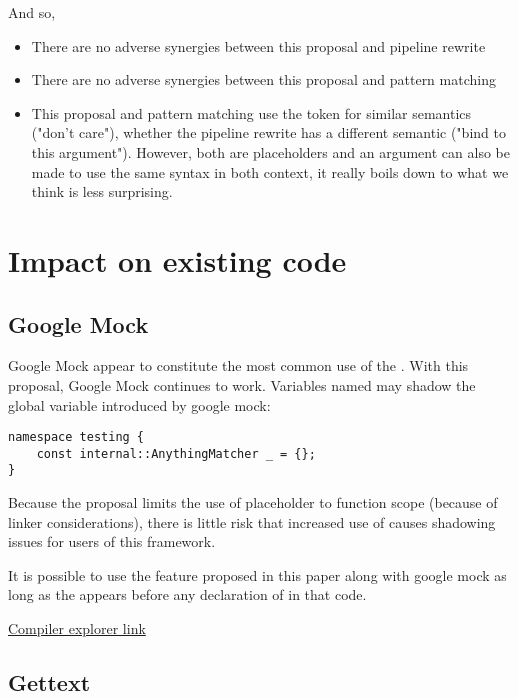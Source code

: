 \documentclass{wg21}
\begin{document}
{And so,

\begin{itemize}
\item There are no adverse synergies between this proposal and pipeline rewrite
\item There are no adverse synergies between this proposal and pattern matching
\item This proposal and pattern matching use the \tcode{_} token for similar semantics ("don't care"), whether the pipeline rewrite has a different semantic ("bind to this argument").
However, both are placeholders and an argument can also be made to use the same syntax in both context, it really boils down to what we think is less surprising.
\end{itemize}


\section{Impact on existing code}

\subsection{Google Mock}

Google Mock appear to constitute the most common use of the .
With this proposal, Google Mock continues to work.
Variables named \tcode{_} may shadow the  global variable introduced by google mock:

\begin{lstlisting}[style=color]
namespace testing {
    const internal::AnythingMatcher _ = {};
}
\end{lstlisting}

Because the proposal limits the use of placeholder to function scope (because of linker considerations),
there is little risk that increased use of \tcode{_} causes shadowing issues for users of this framework.

It is possible to use the feature proposed in this paper along with google mock as long as the 
appears before any declaration of \tcode{_} in that code.

\href{https://godbolt.org/z/EghbHF}{Compiler explorer link}

\subsection{Gettext}

}
\end{document}
